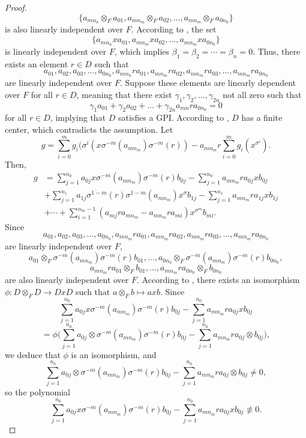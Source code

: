 \documentclass{cimart}
\begin{document}
\begin{proof}
    \[
    \{  a_{mn_n}\otimes_F a_{01}, a_{mn_m}\otimes_F a_{02}, \dots,  a_{mn_m}\otimes_F a_{0n_0}\}
    \]
    is also linearly independent over $F$. According to \cite[Remark 6.1.1]{k}, the set 
    \[
    \{a_{mn_n}xa_{01}, a_{mn_m}xa_{02}, \dots,  a_{mn_m}xa_{0n_0}\}
    \]
    is linearly independent over $F$, which implies $\beta _1=\beta_2=\cdots =\beta_n=0$. Thus, there exists an element $r\in D$ such that
	\[
    a_{01}, a_{02}, a_{03}, \dots, a_{0n_0}, a_{mn_n}ra_{01}, a_{mn_m}ra_{02}, a_{mn_m}ra_{03},\dots,  a_{mn_m}ra_{0n_0} 
    \]
	are linearly independent over $F$. Suppose these elements are linearly dependent over $F$ for all $r\in D$, meaning that there exist $\gamma_1,\gamma_2,\dots,\gamma_{2n}$ not all zero such that
	$$\gamma_1a_{01}+\gamma_2a_{02}+\dots+\gamma_{2n}a_{mn}ra_{0n_0}=0$$
	for all $r\in D$, implying that $D$ satisfies a GPI. According to \cite{s1}, $D$ has a finite center, which contradicts the assumption.
	Let 
	$$g=\sum _{i=0}^{m} g_i(\sigma^i(x\sigma^{-m}(a_{mn_m})\sigma^{-m}(r))-a_{mn_m}r\sum _{i=0}^m g_i( x^{\sigma^i}).$$
	Then,
	\begin{align*}
	g&= \sum_{j=1}^{n_0} a_{0j}x\sigma^{-m}(a_{mn_m})\sigma^{-m}(r)b_{0j}- \sum_{j=1}^{n_0} a_{mn_m}ra_{0j}x b_{0j}\\
	&+\sum_{j=1}^{n_1}a_{1j}\sigma^{1-m}(r)\sigma^{1-m}(a_{mn_m})x^{\sigma }b_{1j}-\sum _{j=1}^{n_1}a_{mn_m} r a_{1j}x b_{1j}\\
	&+ \cdots +\sum_{i=1}^{n_m-1}(a_{mj}r a_{mn_m}-a_{mn_m}r a_{mi})x^{\sigma^m}b_{mi}.
	\end{align*}
	Since $$a_{01}, a_{02}, a_{03}, \dots, a_{0n_0}, a_{mn_m}ra_{01}, a_{mn_m}ra_{02}, a_{mn_m}ra_{03},\dots,  a_{mn_m}ra_{0n_0}$$ are linearly independent over $F$, $$a_{01}\otimes_F\sigma^{-m}(a_{mn_m})\sigma^{-m}(r)b_{01},\dots,a_{0n_0}\otimes_F\sigma^{-m}(a_{mn_m})\sigma^{-m}(r)b_{0n_0},$$ $$a_{mn_m}ra_{01}\otimes_F b_{01},\dots, a_{mn_m}ra_{0n_0}\otimes_F b_{0n_0}$$ are also linearly independent over $F$. According to \cite[Remark 6.1.1]{k}, there exists an isomorphism $\phi: D\otimes_FD\to DxD$ such that $a\otimes_Fb \mapsto axb$. Since 
	$$ \sum_{j=1}^{n_0} a_{0j}x\sigma^{-m}(a_{mn_m})\sigma^{-m}(r)b_{0j}- \sum_{j=1}^{n_0} a_{mn_m}ra_{0j}x b_{0j}$$$$= \phi\big(\sum_{j=1}^{n_0} a_{0j}\otimes\sigma^{-m}(a_{mn_m})\sigma^{-m}(r)b_{0j}- \sum_{j=1}^{n_0} a_{mn_m}ra_{0j}\otimes b_{0j}\big),$$ we deduce that $\phi$ is an isomorphism, and $$\sum_{j=1}^{n_0} a_{0j}\otimes\sigma^{-m}(a_{mn_m})\sigma^{-m}(r)b_{0j}- \sum_{j=1}^{n_0} a_{mn_m}ra_{0j}\otimes b_{0j}\neq 0,$$ so the polynomial
	$$ \sum_{j=1}^{n_0} a_{0j}x\sigma^{-m}(a_{mn_m})\sigma^{-m}(r)b_{0j}- \sum_{j=1}^{n_0} a_{mn_m}ra_{0j}x b_{0j}\not\equiv 0.$$  

\end{proof}
\end{document}
